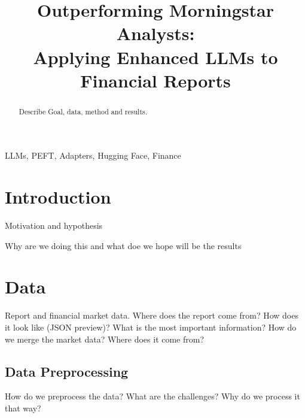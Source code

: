 \documentclass[conference]{IEEEtran}
\begin{document}
\title{Outperforming Morningstar Analysts: \\ Applying Enhanced LLMs to Financial Reports
}

\author{
\and
{}
}

\maketitle

\begin{abstract}
Describe Goal, data, method and results.
\end{abstract}

\begin{IEEEkeywords}
LLMs, PEFT, Adapters, Hugging Face, Finance
\end{IEEEkeywords}

\section{Introduction}
Motivation and hypothesis \cite{Poth2023,Kokhlikyan2020,Russell2021,Kauermann2021}

Why are we doing this and what doe we hope will be the results
\section{Data} %
Report and financial market data.
Where does the report come from? How does it look like (JSON preview)? What is the most important information?
How do we merge the market data? Where does it come from?
\subsection{Data Preprocessing}%
How do we preprocess the data? What are the challenges?
Why do we process it that way?
\end{document}

